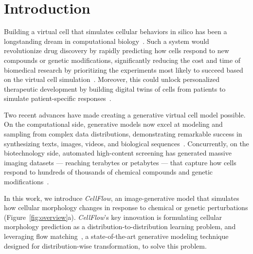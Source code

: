 \section{Introduction}
\label{sec:intro}



Building a virtual cell that simulates cellular behaviors in silico has been a longstanding dream in computational biology~\cite{slepchenko2003quantitative, johnson2023building, bunne2024build}. Such a system would revolutionize drug discovery by rapidly predicting how cells respond to new compounds or genetic modifications, significantly reducing the cost and time of biomedical research by prioritizing the experiments most likely to succeed based on the virtual cell simulation~\cite{carpenter2007image}. Moreover, this could unlock personalized therapeutic development by building digital twins of cells from patients to simulate patient-specific responses~\cite{katsoulakis2024digital}.

Two recent advances have made creating a generative virtual cell model possible. On the computational side, generative models now excel at modeling and sampling from complex data distributions, demonstrating remarkable success in synthesizing texts, images, videos, and biological sequences~\cite{openai2024gpt4technicalreport, esser2024scaling,pmlr-v235-kondratyuk24a,hayes2025simulating}. Concurrently, on the biotechnology side, automated high-content screening has generated massive imaging datasets --- reaching terabytes or petabytes --- that capture how cells respond to hundreds of thousands of chemical compounds and genetic modifications~\cite{chandrasekaran2023jump, fay2023rxrx3}.

In this work, we introduce \emph{CellFlow}, an image-generative model that simulates how cellular morphology changes in response to chemical or genetic perturbations (Figure~\ref{fig:overview}a). \emph{CellFlow}’s key innovation is formulating cellular morphology prediction as a distribution-to-distribution learning problem, and leveraging flow matching~\cite{lipman2022flow}, a state-of-the-art generative modeling technique designed for distribution-wise transformation, to solve this problem.

